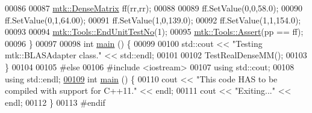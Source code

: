 \begin{DoxyCode}
00086 
00087   \hyperlink{classmtk_1_1DenseMatrix}{mtk::DenseMatrix} ff(rr,rr);
00088 
00089   ff.SetValue(0,0,58.0);
00090   ff.SetValue(0,1,64.00);
00091   ff.SetValue(1,0,139.0);
00092   ff.SetValue(1,1,154.0);
00093 
00094   \hyperlink{classmtk_1_1Tools_aba67d9dc35c9c1c49430fcc9ea035e03}{mtk::Tools::EndUnitTestNo}(1);
00095   \hyperlink{classmtk_1_1Tools_ac6804df469c94ab6a796fb64f1e44a89}{mtk::Tools::Assert}(pp == ff);
00096 \}
00097 
00098 \textcolor{keywordtype}{int} \hyperlink{mtk__blas__adapter__test_8cc_ae66f6b31b5ad750f1fe042a706a4e3d4}{main} () \{
00099 
00100   std::cout << \textcolor{stringliteral}{"Testing mtk::BLASAdapter class."} << std::endl;
00101 
00102   TestRealDenseMM();
00103 \}
00104 
00105 \textcolor{preprocessor}{#else}
00106 \textcolor{preprocessor}{#include <iostream>}
00107 \textcolor{keyword}{using} std::cout;
00108 \textcolor{keyword}{using} std::endl;
\hypertarget{mtk__blas__adapter__test_8cc_source_l00109}{}\hyperlink{mtk__blas__adapter__test_8cc_ae66f6b31b5ad750f1fe042a706a4e3d4}{00109} \textcolor{keywordtype}{int} \hyperlink{mtk__blas__adapter__test_8cc_ae66f6b31b5ad750f1fe042a706a4e3d4}{main} () \{
00110   cout << \textcolor{stringliteral}{"This code HAS to be compiled with support for C++11."} << endl;
00111   cout << \textcolor{stringliteral}{"Exiting..."} << endl;
00112 \}
00113 \textcolor{preprocessor}{#endif}
\end{DoxyCode}
